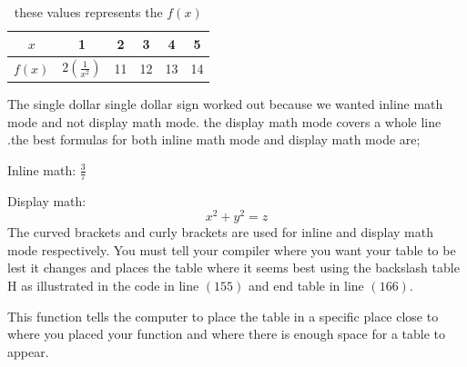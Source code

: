 \documentclass{article}
\begin{document}
  		 \vspace{30pt}
  		 
  		 \def\arraystretch{3}
  		 \begin{table}
  		 \centering
  		 \begin{tabular}{|c||c|c|c|c|c|}
  		 	\hline
  		 	
  		 	$x$ & 1 & 2 & 3 & 4 & 5\\ \hline
  		 	$f(x)$ & $2\displaystyle\left(\frac{1}{x^2}\right)$ & 11 & 12 & 13 & 14\\ \hline
  		 	\end{tabular}
  		 	\caption{these values represents the $f(x)$}
  		 	\end{table}
  		 The single dollar single dollar sign worked out because we wanted inline math mode and not display math mode. the display math mode covers a whole line .the best formulas for both inline math mode and display math mode are; 
  		 
  		 Inline math: \(\frac{3}{7}  \)
  		 
  		 Display math: \[x^2 +y^2 = z  \]The curved brackets and curly brackets are used for inline and display math mode respectively.
  		 You must tell your compiler where you want your table to be lest it changes and places the table where it seems best using the backslash table H as illustrated in the code in line  \(\left(155\right)\) and end table in line \(\left(166\right)\). 
  		 
  		 This function tells the computer to place the table in a specific place close to where you placed your function and where there is enough space for a table to appear.
  		 
  		
  		  
	
\end{document}
